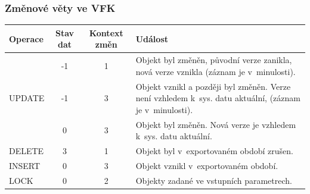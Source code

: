 \documentclass{beamer}
\begin{document}
\begin{frame}
\frametitle{Změnové věty ve VFK}

\begingroup 
  \fontsize{8pt}{12pt}\selectfont


\begin{table}[htbp]
\centering
\begin{tabular}{lccl}
\toprule
\textbf{Operace} & \textbf{\parbox{20pt}{Stav dat}} & \textbf{\parbox{30pt}{Kontext změn}} & \textbf{Událost} \\ \midrule
\multirow{3}{*}{UPDATE} & -1 & 1 & \parbox{150pt}{Objekt byl změněn, původní verze zanikla, nová verze vznikla (záznam je v~minulosti).} \vspace{6pt} \\ 
 & -1 & 3 & \parbox{150pt}{Objekt vznikl a později byl změněn. Verze není vzhledem k~sys. datu aktuální, (záznam je v~minulosti).} \vspace{6pt} \\ 
 & 0 & 3 & \parbox{150pt}{Objekt byl změněn. Nová verze je vzhledem k~sys. datu aktuální.} \vspace{6pt} \\ 
DELETE & 3 & 1 & \parbox{150pt}{Objekt byl v~exportovaném období zrušen.} \vspace{6pt} \\ 
INSERT & 0 & 3 & \parbox{150pt}{Objekt vznikl v~exportovaném období.} \vspace{6pt} \\ 
LOCK & 0 & 2 & \parbox{150pt}{Objekty zadané ve vstupních parametrech.} \\ \bottomrule
\end{tabular}
\end{table}

\endgroup
\end{frame}

\end{document}
